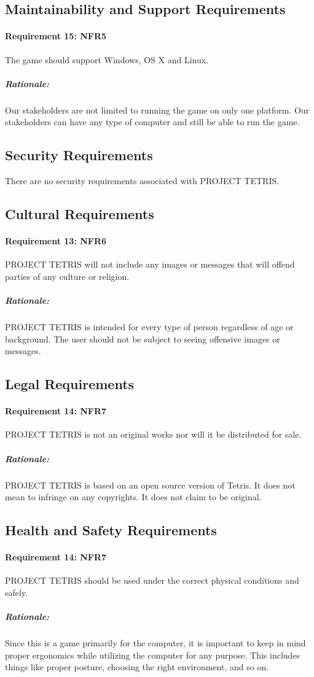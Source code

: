\documentclass[12pt, titlepage]{article}
\begin{document}
\subsection{Maintainability and Support Requirements}
\paragraph{Requirement 15: NFR5}
The game should support Windows, OS X and Linux.
\subparagraph{Rationale:}
Our stakeholders are not limited to running the game on only one platform. Our stakeholders can have any type of computer and still be able to run the game.

\subsection{Security Requirements}
There are no security requirements associated with PROJECT TETRIS.

\subsection{Cultural Requirements}
\paragraph{Requirement 13: NFR6}
PROJECT TETRIS will not include any images or messages that will offend parties of any culture or religion.
\subparagraph{Rationale:}
PROJECT TETRIS is intended for every type of person regardless of age or background. The user should not be subject to seeing offensive images or messages.

\subsection{Legal Requirements}
\paragraph{Requirement 14: NFR7}
PROJECT TETRIS is not an original works nor will it be distributed for sale.
\subparagraph{Rationale:}
PROJECT TETRIS is based on an open source version of Tetris. It does not mean to infringe on any copyrights. It does not claim to be original.

\subsection{Health and Safety Requirements}
\paragraph{Requirement 14: NFR7}
PROJECT TETRIS should be used under the correct physical conditions and safely.\subparagraph{Rationale:}
Since this is a game primarily for the computer, it is important to keep in mind proper ergonomics while utilizing the computer for any purpose. This includes things like proper posture, choosing the right environment, and so on.
\end{document}

